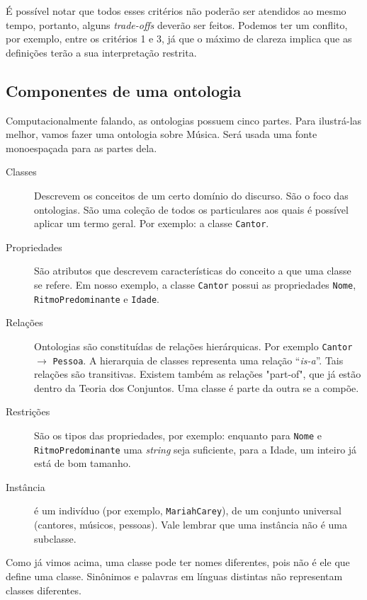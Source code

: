 É possível notar que todos esses critérios não poderão ser atendidos ao mesmo tempo, portanto, alguns \textit{trade-offs} deverão ser feitos.
Podemos ter um conflito, por exemplo, entre os critérios 1 e 3, já que o máximo de clareza implica que as definições terão a sua interpretação restrita.

\subsection{Componentes de uma ontologia}

Computacionalmente falando, as ontologias possuem cinco partes. Para ilustrá-las melhor, vamos fazer uma ontologia sobre Música. Será usada uma fonte monoespaçada para as partes dela.

\begin{description}
	\item[Classes] Descrevem os conceitos de um certo domínio do discurso. São o foco das ontologias. São uma coleção de todos os particulares aos quais é possível aplicar um termo geral. Por exemplo: a classe \texttt{Cantor}.
	\item[Propriedades] São atributos que descrevem características do conceito a que uma classe se refere. Em nosso exemplo, a classe \texttt{Cantor} possui as propriedades \texttt{Nome}, \\ \texttt{RitmoPredominante} e \texttt{Idade}.
	\item[Relações] Ontologias são constituídas de relações hierárquicas. Por exemplo \texttt{Cantor} $ \to $ \texttt{Pessoa}. A hierarquia de classes representa uma relação “\textit{is-a}”\cite{ontoFranca}. Tais relações são transitivas. Existem também as relações "part-of", que já estão dentro da Teoria dos Conjuntos. Uma classe é parte da outra se a compõe.
	\item[Restrições] São os tipos das propriedades, por exemplo: enquanto para \texttt{Nome} e \\ \texttt{RitmoPredominante} uma \textit{string} seja suficiente, para a Idade, um inteiro já está de bom tamanho.
	\item[Instância] é um indivíduo (por exemplo, \texttt{MariahCarey}), de um conjunto universal (cantores, músicos, pessoas). Vale lembrar que uma instância não é uma subclasse.
\end{description}

Como já vimos acima, uma classe pode ter nomes diferentes, pois não é ele que define uma classe. Sinônimos e palavras em línguas distintas não representam classes diferentes.

